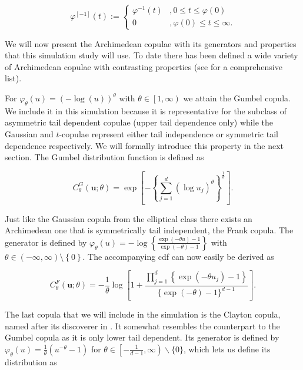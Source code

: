 \begin{equation}
	\varphi^{[-1]}(t):=\left\{\begin{array}{ll}
		\varphi^{-1}(t)&, 0 \leq t \leq \varphi(0) \\
		0 & , \varphi(0) \leq t \leq \infty .
	\end{array}\right.
\end{equation}

We will now present the Archimedean copulae with its generators and properties that this simulation study will use. To date there has been defined a wide variety of Archimedean copulae with contrasting properties (see \citet{nelsen2007introduction} for a comprehensive list).

For $\varphi_\theta \left( u\right) = \left(- \log\left(u \right)\right)^{\theta} $ with $\theta \in \left[ 1,\infty\right) $ we attain the Gumbel copula. We include it in this simulation because it is representative for the subclass of asymmetric tail dependent copulae (upper tail dependence only) while the Gaussian and $t$-copulae represent either tail independence or symmetric tail dependence respectively. We will formally introduce this property in the next section. The Gumbel distribution function is defined as

\begin{equation}
	C_{\theta}^{G}\left(\mathbf{u}; \theta\right)=\exp \left[-\left\{\sum_{j=1}^{d}\left(\log u_{j}\right)^{\theta}\right\}^{\frac{1}{\theta}}\right] .
\end{equation}

Just like the Gaussian copula from the elliptical class there exists an Archimedean one that is symmetrically tail independent, the Frank copula. The generator is defined by $\varphi_{\theta}(u)=-\log \left\{\frac{\exp (-\theta u)-1}{\exp (-\theta)-1}\right\}$ with $\theta \in \left(-\infty, \infty \right) \setminus \left\lbrace 0\right\rbrace$. The accompanying cdf can now easily be derived as

\begin{equation}
	C_{\theta}^{F}\left( \mathbf{u}; \theta \right)=-\frac{1}{\theta} \log \left[1+\frac{\prod_{j=1}^{d}\left\{\exp \left(-\theta u_{j}\right)-1\right\}}{\{\exp (-\theta)-1\}^{d-1}}\right] .
\end{equation}  

The last copula that we will include in the simulation is the Clayton copula, named after its discoverer in \citet{clayton1978model}. It somewhat resembles the counterpart to the Gumbel copula as it is only lower tail dependent. Its generator is defined by $\varphi_{\theta}(u)=\frac{1}{\theta}\left(u^{-\theta}-1\right)$ for $\theta \in\left[-\frac{1}{d-1}, \infty\right) \backslash\{0\}$, which lets us define its distribution as 

